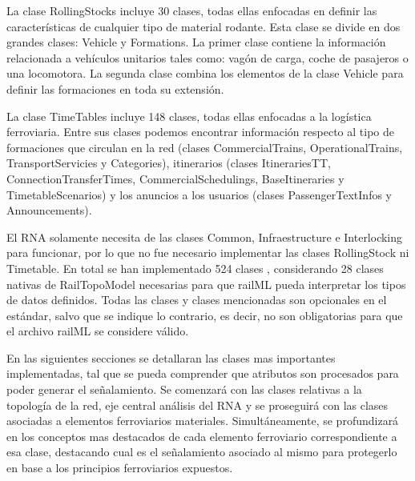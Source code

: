     La clase RollingStocks incluye 30 clases, todas ellas enfocadas en definir las características de cualquier tipo de material rodante. Esta clase se divide en dos grandes clases: Vehicle y Formations. La primer clase contiene la información relacionada a vehículos unitarios tales como: vagón de carga, coche de pasajeros o una locomotora. La segunda clase combina los elementos de la clase Vehicle para definir las formaciones en toda su extensión.
    
    La clase TimeTables incluye 148 clases, todas ellas enfocadas a la logística ferroviaria. Entre sus clases podemos encontrar información respecto al tipo de formaciones que circulan en la red (clases CommercialTrains, OperationalTrains, TransportServicies y Categories), itinerarios (clases ItinerariesTT, ConnectionTransferTimes, CommercialSchedulings, BaseItineraries y TimetableScenarios) y los anuncios a los usuarios (clases PassengerTextInfos y Announcements).   
    
    El RNA solamente necesita de las clases Common, Infraestructure e Interlocking para funcionar, por lo que no fue necesario implementar las clases RollingStock ni Timetable. En total se han implementado 524 clases \cite{GITHUB}, considerando 28 clases nativas de RailTopoModel necesarias para que railML pueda interpretar los tipos de datos definidos. Todas las clases y clases mencionadas son opcionales en el estándar, salvo que se indique lo contrario, es decir, no son obligatorias para que el archivo railML se considere válido.

    En las siguientes secciones se detallaran las clases mas importantes implementadas, tal que se pueda comprender que atributos son procesados para poder generar el señalamiento. Se comenzará con las clases relativas a la topología de la red, eje central análisis del RNA y se proseguirá con las clases asociadas a elementos ferroviarios materiales. Simultáneamente, se profundizará en los conceptos mas destacados de cada elemento ferroviario correspondiente a esa clase, destacando cual es el señalamiento asociado al mismo para protegerlo en base a los principios ferroviarios expuestos.

    
    

    
    
    
    
    
    
    
    
    
    
    